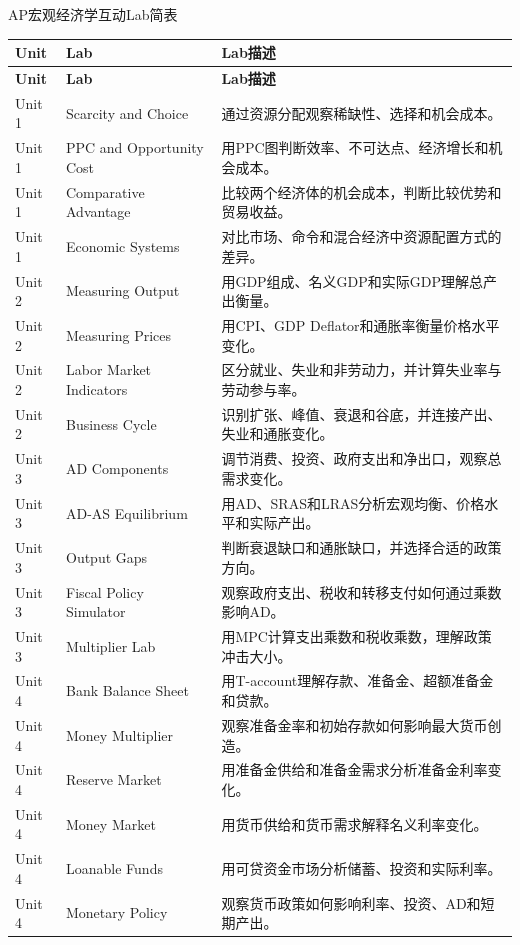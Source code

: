 \documentclass[11pt]{article}
\begin{document}
\begin{center}
{\Large AP宏观经济学互动Lab简表}
\end{center}

\begin{longtable}{p{} p{} p{}}
\toprule
\textbf{Unit} & \textbf{Lab} & \textbf{Lab描述} \\
\midrule
\endfirsthead
\toprule
\textbf{Unit} & \textbf{Lab} & \textbf{Lab描述} \\
\midrule
\endhead

Unit 1 & Scarcity and Choice & 通过资源分配观察稀缺性、选择和机会成本。 \\
Unit 1 & PPC and Opportunity Cost & 用PPC图判断效率、不可达点、经济增长和机会成本。 \\
Unit 1 & Comparative Advantage & 比较两个经济体的机会成本，判断比较优势和贸易收益。 \\
Unit 1 & Economic Systems & 对比市场、命令和混合经济中资源配置方式的差异。 \\

Unit 2 & Measuring Output & 用GDP组成、名义GDP和实际GDP理解总产出衡量。 \\
Unit 2 & Measuring Prices & 用CPI、GDP Deflator和通胀率衡量价格水平变化。 \\
Unit 2 & Labor Market Indicators & 区分就业、失业和非劳动力，并计算失业率与劳动参与率。 \\
Unit 2 & Business Cycle & 识别扩张、峰值、衰退和谷底，并连接产出、失业和通胀变化。 \\

Unit 3 & AD Components & 调节消费、投资、政府支出和净出口，观察总需求变化。 \\
Unit 3 & AD-AS Equilibrium & 用AD、SRAS和LRAS分析宏观均衡、价格水平和实际产出。 \\
Unit 3 & Output Gaps & 判断衰退缺口和通胀缺口，并选择合适的政策方向。 \\
Unit 3 & Fiscal Policy Simulator & 观察政府支出、税收和转移支付如何通过乘数影响AD。 \\
Unit 3 & Multiplier Lab & 用MPC计算支出乘数和税收乘数，理解政策冲击大小。 \\

Unit 4 & Bank Balance Sheet & 用T-account理解存款、准备金、超额准备金和贷款。 \\
Unit 4 & Money Multiplier & 观察准备金率和初始存款如何影响最大货币创造。 \\
Unit 4 & Reserve Market & 用准备金供给和准备金需求分析准备金利率变化。 \\
Unit 4 & Money Market & 用货币供给和货币需求解释名义利率变化。 \\
Unit 4 & Loanable Funds & 用可贷资金市场分析储蓄、投资和实际利率。 \\
Unit 4 & Monetary Policy & 观察货币政策如何影响利率、投资、AD和短期产出。 \\


\end{longtable}
\end{document}
